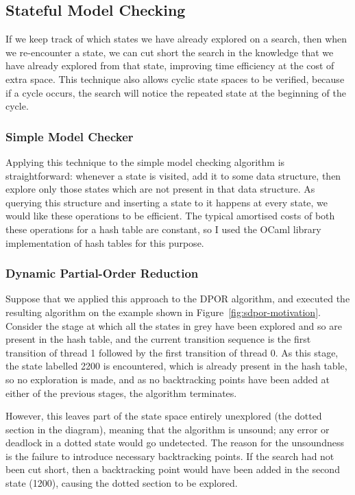 \documentclass[12pt,a4paper,twoside,openany]{report}
\begin{document}
\subsection{Stateful Model Checking}
If we keep track of which states we have
already explored on a search, then when
we re-encounter a state, we can cut short
the search in the knowledge that we have
already explored from that state, improving
time efficiency at the cost of extra space.
This technique also allows cyclic state spaces
to be verified, because if a cycle occurs, the
search will notice the repeated state at the
beginning of the cycle.

\subsubsection{Simple Model Checker}

Applying this technique to the simple model
checking algorithm is straightforward: whenever
a state is visited, add it to some data structure,
then explore only those states which are not
present in that data structure. As querying
this structure and inserting a state to it
happens at every state, we would like these
operations to be efficient. The typical amortised costs
of both these operations for a hash table are
constant, so I used the OCaml library implementation
of hash tables for this purpose.

\subsubsection{Dynamic Partial-Order Reduction}
Suppose that we applied this approach
to the DPOR algorithm,
and executed the resulting algorithm
on the example shown in
Figure~\ref{fig:sdpor-motivation}.
Consider the stage at which
all the states in grey have been
explored and so are present in the hash table,
and the current transition sequence is the first
transition of thread 1 followed by the first
transition of thread 0. As this stage, the state
labelled 2200 is encountered, which is already
present in the hash table, so no exploration is
made, and as no backtracking points have been added
at either of the previous stages, the algorithm
terminates.

However, this leaves part of the state
space entirely unexplored (the dotted section in
the diagram), meaning that the algorithm is unsound;
any error or deadlock in a dotted state would go
undetected.
The reason for the unsoundness is the failure to
introduce necessary backtracking points. If the
search had not been cut short, then a backtracking point
would have been added in the second state (1200), causing the
dotted section to be explored.
\end{document}
